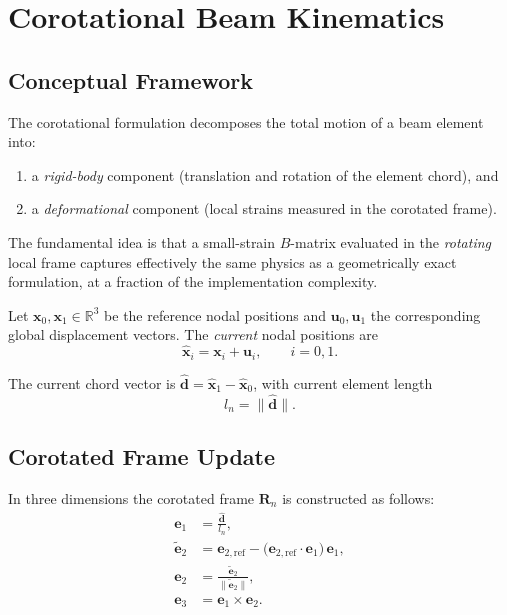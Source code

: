 \section{Corotational Beam Kinematics}
\label{sec:corot-kinematics}

\subsection{Conceptual Framework}

The corotational formulation decomposes the total motion of a beam
element into:
\begin{enumerate}\itemsep0pt
  \item a \emph{rigid-body} component (translation and rotation of the
        element chord), and
  \item a \emph{deformational} component (local strains measured in the
        corotated frame).
\end{enumerate}

The fundamental idea is that a small-strain $B$-matrix evaluated in the
\emph{rotating} local frame captures effectively the same physics as a
geometrically exact formulation, at a fraction of the implementation
complexity.

Let $\mathbf{x}_0, \mathbf{x}_1 \in \mathbb{R}^3$ be the reference
nodal positions and $\mathbf{u}_0, \mathbf{u}_1$ the corresponding
global displacement vectors.  The \emph{current} nodal positions are
\begin{equation}\label{eq:current-positions}
  \hat{\mathbf{x}}_i = \mathbf{x}_i + \mathbf{u}_i,
  \qquad i = 0, 1.
\end{equation}

The current chord vector is
$\hat{\mathbf{d}} = \hat{\mathbf{x}}_1 - \hat{\mathbf{x}}_0$, with
current element length
\begin{equation}
  l_n = \lVert \hat{\mathbf{d}} \rVert.
\end{equation}

\subsection{Corotated Frame Update}

In three dimensions the corotated frame $\mathbf{R}_n$ is constructed as
follows:
\begin{align}
  \mathbf{e}_1 &= \frac{\hat{\mathbf{d}}}{l_n},
  \\[6pt]
  \tilde{\mathbf{e}}_2 &= \mathbf{e}_{2,\mathrm{ref}}
    - \bigl(\mathbf{e}_{2,\mathrm{ref}} \cdot \mathbf{e}_1\bigr)\,
      \mathbf{e}_1,
  \\[4pt]
  \mathbf{e}_2 &= \frac{\tilde{\mathbf{e}}_2}
                       {\lVert \tilde{\mathbf{e}}_2 \rVert},
  \\[4pt]
  \mathbf{e}_3 &= \mathbf{e}_1 \times \mathbf{e}_2.
\end{align}

